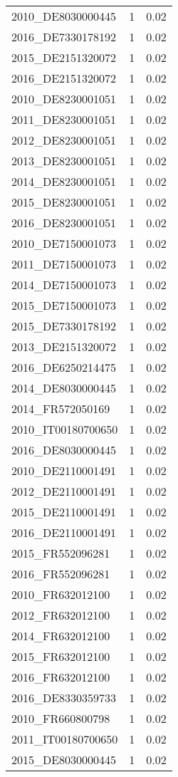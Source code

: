 \begin{table*}[htbp]
\begin{tabular}{lrr}
2010_DE8030000445 & 1 & 0.02 \\
2016_DE7330178192 & 1 & 0.02 \\
2015_DE2151320072 & 1 & 0.02 \\
2016_DE2151320072 & 1 & 0.02 \\
2010_DE8230001051 & 1 & 0.02 \\
2011_DE8230001051 & 1 & 0.02 \\
2012_DE8230001051 & 1 & 0.02 \\
2013_DE8230001051 & 1 & 0.02 \\
2014_DE8230001051 & 1 & 0.02 \\
2015_DE8230001051 & 1 & 0.02 \\
2016_DE8230001051 & 1 & 0.02 \\
2010_DE7150001073 & 1 & 0.02 \\
2011_DE7150001073 & 1 & 0.02 \\
2014_DE7150001073 & 1 & 0.02 \\
2015_DE7150001073 & 1 & 0.02 \\
2015_DE7330178192 & 1 & 0.02 \\
2013_DE2151320072 & 1 & 0.02 \\
2016_DE6250214475 & 1 & 0.02 \\
2014_DE8030000445 & 1 & 0.02 \\
2014_FR572050169 & 1 & 0.02 \\
2010_IT00180700650 & 1 & 0.02 \\
2016_DE8030000445 & 1 & 0.02 \\
2010_DE2110001491 & 1 & 0.02 \\
2012_DE2110001491 & 1 & 0.02 \\
2015_DE2110001491 & 1 & 0.02 \\
2016_DE2110001491 & 1 & 0.02 \\
2015_FR552096281 & 1 & 0.02 \\
2016_FR552096281 & 1 & 0.02 \\
2010_FR632012100 & 1 & 0.02 \\
2012_FR632012100 & 1 & 0.02 \\
2014_FR632012100 & 1 & 0.02 \\
2015_FR632012100 & 1 & 0.02 \\
2016_FR632012100 & 1 & 0.02 \\
2016_DE8330359733 & 1 & 0.02 \\
2010_FR660800798 & 1 & 0.02 \\
2011_IT00180700650 & 1 & 0.02 \\
2015_DE8030000445 & 1 & 0.02 \\

\end{tabular}
\end{table*}
